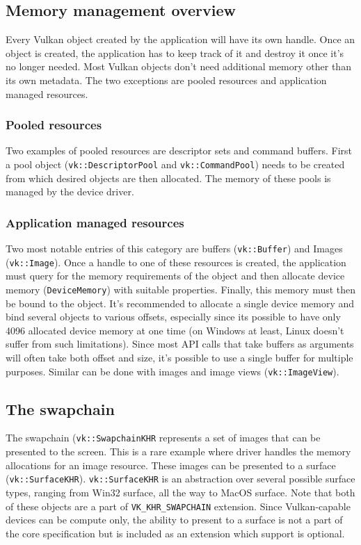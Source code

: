 \documentclass[times, utf8, zavrsni, numeric]{fer}
\begin{document}
\subsection{Memory management overview}
Every Vulkan object created by the application will have its own handle. Once an object is created, the application has to keep track of it and destroy it once it's no longer needed. Most Vulkan objects don't need additional memory other than its own metadata. The two exceptions are pooled resources and application managed resources.

\subsubsection{Pooled resources}
Two examples of pooled resources are descriptor sets and command buffers. First a pool object (\texttt{vk::DescriptorPool} and \texttt{vk::CommandPool}) needs to be created from which desired objects are then allocated. The memory of these pools is managed by the device driver.

\subsubsection{Application managed resources}
Two most notable entries of this category are buffers (\texttt{vk::Buffer}) and Images (\texttt{vk::Image}). Once a handle to one of these resources is created, the application must query for the memory requirements of the object and then allocate device memory (\texttt{DeviceMemory}) with suitable properties. Finally, this memory must then be bound to the object. It's recommended to allocate a single device memory and bind several objects to various offsets, especially since its possible to have only 4096 allocated device memory at one time (on Windows at least, Linux doesn't suffer from such limitations). Since most API calls that take buffers as arguments will often take both offset and size, it's possible to use a single buffer for multiple purposes. Similar can be done with images and image views (\texttt{vk::ImageView}).

\subsection{The swapchain}
The swapchain (\texttt{vk::SwapchainKHR} represents a set of images that can be presented to the screen. This is a rare example where driver handles the memory allocations for an image resource. These images can be presented to a surface (\texttt{vk::SurfaceKHR}). \texttt{vk::SurfaceKHR} is an abstraction over several possible surface types, ranging from Win32 surface, all the way to MacOS surface. Note that both of these objects are a part of \texttt{VK\_KHR\_SWAPCHAIN} extension. Since Vulkan-capable devices can be compute only, the ability to present to a surface is not a part of the core specification but is included as an extension which support is optional.
\end{document}
